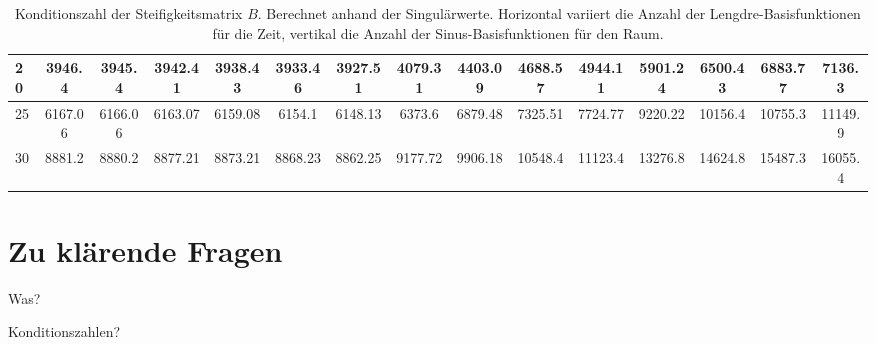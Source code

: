 \begin{landscape}
\begin{table}[tb]
\begin{tabular}{|l|c|c|c|c|c|c|c|c|c|c|c|c|c|c|}
         20 &  3946.4 &  3945.4 & 3942.41 & 3938.43 & 3933.46 & 3927.51 & 4079.31 & 4403.09 & 4688.57 & 4944.11 & 5901.24 & 6500.43 & 6883.77 &  7136.3 \\ \hline
         25 & 6167.06 & 6166.06 & 6163.07 & 6159.08 &  6154.1 & 6148.13 &  6373.6 & 6879.48 & 7325.51 & 7724.77 & 9220.22 & 10156.4 & 10755.3 & 11149.9 \\ \hline
         30 &  8881.2 &  8880.2 & 8877.21 & 8873.21 & 8868.23 & 8862.25 & 9177.72 & 9906.18 & 10548.4 & 11123.4 & 13276.8 & 14624.8 & 15487.3 & 16055.4 \\ \hline
        \end{tabular}
        \caption{Konditionszahl der Steifigkeitsmatrix $B$. Berechnet anhand der Singulärwerte. Horizontal variiert die Anzahl der Lengdre-Basisfunktionen für die Zeit, vertikal die Anzahl der Sinus-Basisfunktionen für den Raum.}
\end{table}
\end{landscape}

\clearpage
\section{Zu klärende Fragen} %
\label{sec:zu_kl_rende_fragen}

Was?

Konditionszahlen?


